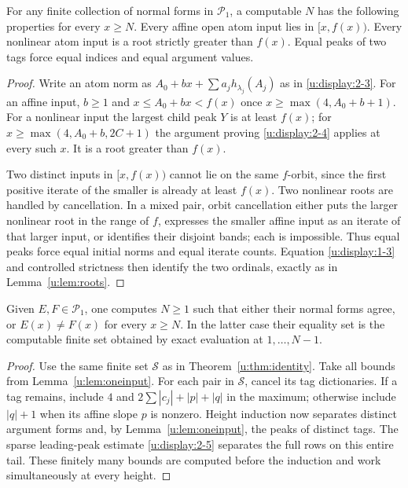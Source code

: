 \begin{lemma}\label{u:lem:oneinput}
For any finite collection of normal forms in $\mathcal P_1$, a computable
$N$ has the following properties for every $x\ge N$.
Every affine open atom input lies in $[x,f(x))$. Every nonlinear atom input
is a root strictly greater than $f(x)$. Equal peaks of two tags force equal
indices and equal argument values.
\end{lemma}
\begin{proof}
Write an atom norm as $A_0+bx+\sum a_jh_{\lambda_j}(A_j)$ as in \eqref{u:display:2-3}.
For an affine input, $b\ge1$ and
$x\le A_0+bx<f(x)$ once $x\ge\max(4,A_0+b+1)$.
For a nonlinear input the largest child peak $Y$ is at least $f(x)$;
for $x\ge\max(4,A_0+b,2C+1)$ the argument proving \eqref{u:display:2-4} applies
at every such $x$. It is a root greater than $f(x)$.

Two distinct inputs in $[x,f(x))$ cannot lie on the same $f$-orbit,
since the first positive iterate of the smaller is already at least
$f(x)$. Two nonlinear roots are handled by cancellation. In a mixed pair,
orbit cancellation either puts the larger nonlinear root in the range of
$f$, expresses the smaller affine input as an iterate of that larger
input, or identifies their disjoint bands; each is impossible. Thus equal
peaks force equal initial norms and equal iterate counts. Equation \eqref{u:display:1-3}
and controlled strictness then identify the two ordinals, exactly as in
Lemma~\ref{u:lem:roots}.
\end{proof}

\begin{theorem}\label{u:thm:zeros}
Given $E,F\in\mathcal P_1$, one computes $N\ge1$ such that either their
normal forms agree, or $E(x)\ne F(x)$ for every $x\ge N$. In the latter
case their equality set is the computable finite set obtained by exact
evaluation at $1,\ldots,N-1$.
\end{theorem}
\begin{proof}
Use the same finite set $\mathcal S$ as in Theorem~\ref{u:thm:identity}.
Take all bounds from Lemma~\ref{u:lem:oneinput}. For each pair in
$\mathcal S$, cancel its tag dictionaries. If a tag remains, include
$4$ and $2\sum|c_j|+|p|+|q|$ in the maximum; otherwise include
$|q|+1$ when its affine slope $p$ is nonzero. Height induction now
separates distinct argument forms and, by Lemma~\ref{u:lem:oneinput}, the
peaks of distinct tags. The sparse leading-peak estimate \eqref{u:display:2-5} separates
the full rows on this entire tail. These finitely many bounds are computed
before the induction and work simultaneously at every height.
\end{proof}

